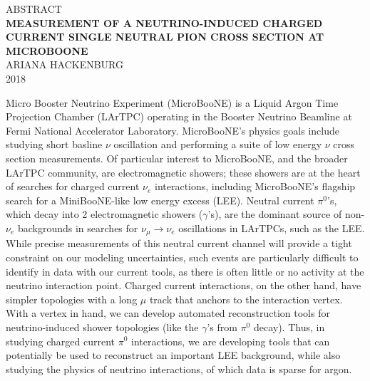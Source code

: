 %

\thispagestyle{empty}
\begin{center}
{\footnotesize ABSTRACT}\\
\vspace{4 mm}
{\large \textbf{MEASUREMENT OF A NEUTRINO-INDUCED CHARGED CURRENT SINGLE NEUTRAL PION CROSS SECTION AT MICROBOONE}}\\
\vspace{6 mm}
{\footnotesize ARIANA HACKENBURG\\
2018\\}
\end{center}

\par
Micro Booster Neutrino Experiment (MicroBooNE) is a Liquid Argon Time Projection Chamber (LArTPC) operating in the Booster Neutrino Beamline at Fermi National Accelerator Laboratory. MicroBooNE's physics goals include studying short basline $\nu$ oscillation and performing a suite of low energy $\nu$ cross section measurements. Of particular interest to MicroBooNE, and the broader LArTPC community, are electromagnetic showers; these showers are at the heart of searches for charged current $\nu_e$ interactions, including MicroBooNE's flagship search for a MiniBooNE-like low energy excess (LEE).  Neutral current $\pi^0$'s, which decay into 2 electromagnetic showers ($\gamma$'s), are the dominant source of non-$\nu_e$ backgrounds in searches for $\nu_{\mu}\rightarrow\nu_e$ oscillations in LArTPCs, such as the LEE. While precise measurements of this neutral current channel will provide a tight constraint on our modeling uncertainties, such events are particularly difficult to identify in data with our current tools, as there is often little or no activity at the neutrino interaction point. Charged current interactions, on the other hand, have simpler topologies with a long $\mu$ track that anchors to the interaction vertex.  With a vertex in hand, we can develop automated reconstruction tools for neutrino-induced shower topologies (like the $\gamma$'s from $\pi^0$ decay). Thus, in studying charged current $\pi^0$ interactions, we are developing tools that can potentially be used to reconstruct an important LEE background, while also studying the physics of neutrino interactions, of which data is sparse for argon.

